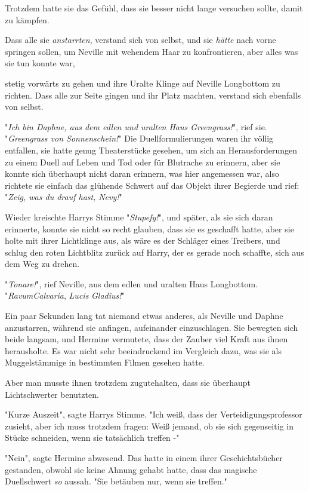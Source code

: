 {Trotzdem hatte sie das Gefühl, dass sie besser nicht lange versuchen sollte, damit zu kämpfen.

Dass alle sie \emph{anstarrten}, verstand sich von selbst, und sie \emph{hätte} nach vorne springen sollen, um Neville mit wehendem Haar zu konfrontieren, aber alles was sie tun konnte war,

stetig vorwärts zu gehen und ihre Uralte Klinge auf Neville Longbottom zu richten. Dass alle zur Seite gingen und ihr Platz machten, verstand sich ebenfalls von selbst.

"\emph{Ich bin Daphne, aus dem edlen und uralten Haus Greengrass!}", rief sie. "\emph{Greengrass von Sonnenschein!}" Die Duellformulierungen waren ihr völlig entfallen, sie hatte genug Theaterstücke gesehen, um sich an Herausforderungen zu einem Duell auf Leben und Tod oder für Blutrache zu erinnern, aber sie konnte sich überhaupt nicht daran erinnern, was hier angemessen war, also richtete sie einfach das glühende Schwert auf das Objekt ihrer Begierde und rief: "\emph{Zeig, was du drauf hast,} \emph{Nevy!}"

Wieder kreischte Harrys Stimme "\emph{Stupefy!}", und später, als sie sich daran erinnerte, konnte sie nicht so recht glauben, dass sie es geschafft hatte, aber sie holte mit ihrer Lichtklinge aus, als wäre es der Schläger eines Treibers, und schlug den roten Lichtblitz zurück auf Harry, der es gerade noch schaffte, sich aus dem Weg zu drehen.

"\emph{Tonare!}", rief Neville, aus dem edlen und uralten Haus Longbottom. "\emph{RavumCalvaria}, \emph{Lucis} \emph{Gladius!}"

Ein paar Sekunden lang tat niemand etwas anderes, als Neville und Daphne anzustarren, während sie anfingen, aufeinander einzuschlagen. Sie bewegten sich beide langsam, und Hermine vermutete, dass der Zauber viel Kraft aus ihnen herausholte. Es war nicht sehr beeindruckend im Vergleich dazu, was sie als Muggelstämmige in bestimmten Filmen gesehen hatte.

Aber man musste ihnen trotzdem zugutehalten, dass sie überhaupt Lichtschwerter benutzten.

"Kurze Auszeit", sagte Harrys Stimme. "Ich weiß, dass der Verteidigungsprofessor zusieht, aber ich muss trotzdem fragen: Weiß jemand, ob sie sich gegenseitig in Stücke schneiden, wenn sie tatsächlich treffen -"

"Nein", sagte Hermine abwesend. Das hatte in einem ihrer Geschichtsbücher gestanden, obwohl sie keine Ahnung gehabt hatte, dass das magische Duellschwert \emph{so} aussah. "Sie betäuben nur, wenn sie treffen."

}
